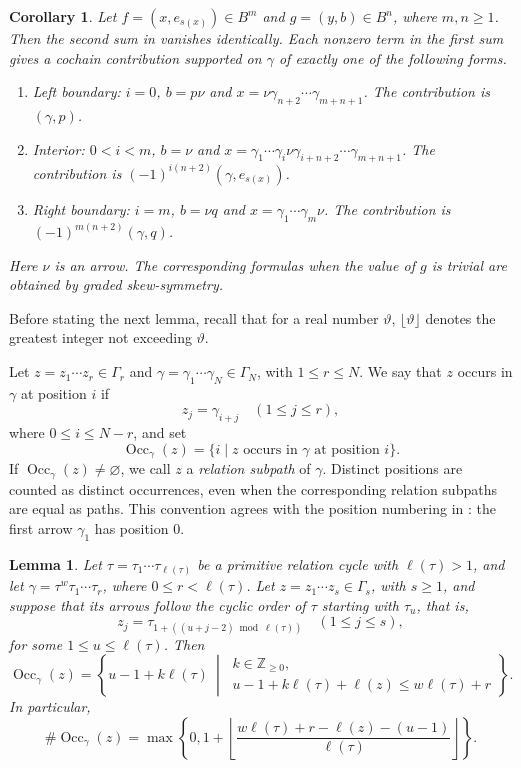 \documentclass[11pt,a4paper,reqno]{amsart}
\newcommand{\Occ}{\operatorname{Occ}}
\newcommand{\para}[2]{(#1,#2)}
\theoremstyle{plain}
\newtheorem{lemma}[lemma]{Lemma}
\newtheorem{corollary}[corollary]{Corollary}
\theoremstyle{definition}
\numberwithin{equation}{section}
\begin{document}
	\begin{corollary}
		\label{cor:higher-trivial-value}
		Let $f=\para{x}{e_{s(x)}}\in B^m$ and $g=\para{y}{b}\in B^n$, where
		$m,n\geq1$.
		Then the second sum in  vanishes identically.  Each nonzero
		term in the first sum gives a cochain
		contribution supported on $\gamma$ of exactly one of the following forms.
		\begin{enumerate}
			\item Left boundary:
			$i=0$, $b=p\nu$ and $x=\nu\gamma_{n+2}\cdots\gamma_{m+n+1}$. The contribution is
			$\para{\gamma}{p}$.
			\item Interior:
			$0<i<m$, $b=\nu$ and $x=\gamma_1\cdots\gamma_i\nu\gamma_{i+n+2}\cdots\gamma_{m+n+1}$. 
			The contribution is $(-1)^{i(n+2)}\para{\gamma}{e_{s(x)}}$.
			\item Right boundary:
			$i=m$, $b=\nu q$ and $x=\gamma_1\cdots\gamma_m\nu$.
			The contribution is $(-1)^{m(n+2)}\para{\gamma}{q}$.
		\end{enumerate}
		Here $\nu$ is an arrow.  The corresponding formulas when the value of $g$
		is trivial are obtained by graded skew-symmetry.
	\end{corollary}
	Before stating the next lemma, recall that for a real number $\vartheta$,
	$\lfloor \vartheta\rfloor$
	denotes the greatest integer not exceeding $\vartheta$.
	
	Let $z=z_1\cdots z_r\in\Gamma_r$ and
	$\gamma=\gamma_1\cdots\gamma_N\in\Gamma_N$, with $1\leq r\leq N$.
	We say that $z$ occurs in $\gamma$ at position $i$ if
	\[
	z_j=\gamma_{i+j}\quad(1\leq j\leq r),
	\]
	where $0\leq i\leq N-r$, and set
	\[
	\Occ_\gamma(z)=\{i \mid z\text{ occurs in }\gamma\text{ at position }i\}.
	\]
	If $\Occ_\gamma(z)\neq\varnothing$, we call $z$ a \emph{relation subpath}
	of $\gamma$. Distinct positions are counted as distinct occurrences, even when
	the corresponding relation subpaths are equal as paths. This convention agrees
	with the position numbering in : the first arrow $\gamma_1$ has
	position $0$.
	
	\begin{lemma}
		\label{lem:periodic-occurrences}
		Let
		$\tau=\tau_1\cdots\tau_{\ell(\tau)}$
		be a primitive relation cycle with $\ell(\tau)>1$, and let
		$\gamma=\tau^w\tau_1\cdots\tau_r$, where
		$0\leq r<\ell(\tau)$.
		Let $z=z_1\cdots z_s\in\Gamma_s$, with $s\geq1$, and suppose that its arrows follow the cyclic order of $\tau$ starting with $\tau_u$, that is,
		\[
		z_j=\tau_{1+((u+j-2)\bmod \ell(\tau))}
		\quad(1\leq j\leq s),
		\]
		for some $1\leq u\leq\ell(\tau)$.  Then
		\[
		\Occ_{\gamma}(z)
		=
		\left\{
		u-1+k\ell(\tau)
		\ \middle|\
		\begin{array}{l}
			k\in\mathbb Z_{\geq0},\\[1mm]
			u-1+k\ell(\tau)+\ell(z)
			\leq w\ell(\tau)+r
		\end{array}
		\right\}.
		\]
		In particular,
		\[
		\#\Occ_{\gamma}(z)
		=
		\max\left\{
		0,
		1+
		\left\lfloor
		\frac{w\ell(\tau)+r-\ell(z)-(u-1)}{\ell(\tau)}
		\right\rfloor
		\right\}.
		\]
	\end{lemma}
	
\end{document}
